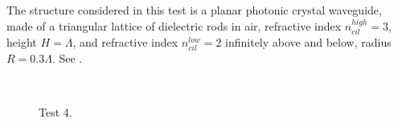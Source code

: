 The structure considered in this test is a planar photonic crystal
waveguide, made of a triangular lattice of dielectric rods in air,
refractive index $n_{cil}^{high} = 3$, height $H = \Lambda$,
and refractive index $n_{cil}^{low} = 2$ infinitely above and below, radius
$R = 0.3 \Lambda$. See .

\begin{figure}[htbp]
  \begin{center}
    \\
  \end{center}
  \caption{Test 4.}
  \label{fig:test_4}
\end{figure}


